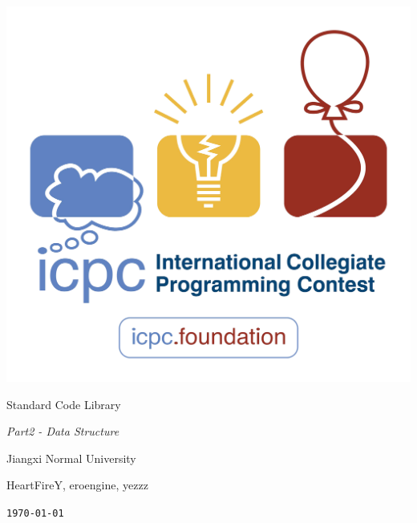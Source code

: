 \documentclass{article}
\begin{document}
\pagestyle{empty}
\begin{center}

    \includegraphics[width=.7\linewidth]{ICPC.png}
    
    \vspace{5em}
    
    \Huge{{Standard Code Library}}
    
    \vspace{2em}
    
    \huge{\textit{Part2 - Data Structure}}
    
    \vspace{2em}
    
    \Large{\textsf{Jiangxi Normal University}}
    
    \vspace{0.4em}
    
    \Large{\textsf{HeartFireY, eroengine, yezzz}}
    
    \vspace{0.6em}
    
    \texttt{\today}
    
\end{center}
\end{document}
